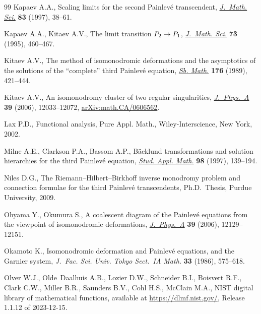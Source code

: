 \documentclass[11pt]{article}
\numberwithin{equation}{section}
\numberwithin{equation}{section}
\begin{document}
\begin{thebibliography}{99}
Kapaev A.A., Scaling limits for the second {P}ainlev\'e transcendent,
 \href{https://doi.org/10.1007/BF02398460}{\textit{J.~Math. Sci.}} \textbf{83} (1997), 38--61.

Kapaev A.A., Kitaev A.V., The limit transition {${\rm P}_2\to{\rm P}_1$},
 \href{https://doi.org/10.1007/BF02364568}{\textit{J.~Math. Sci.}} \textbf{73} (1995), 460--467.

Kitaev A.V., The method of isomonodromic deformations and the asymptotics of
 the solutions of the ``complete'' third {P}ainlev\'e equation, \href{https://doi.org/10.1070/SM1989v062n02ABEH003247}{\textit{Sb.
 Math.}} \textbf{176} (1989), 421--444.

Kitaev A.V., An isomonodromy cluster of two regular singularities,
 \href{https://doi.org/10.1088/0305-4470/39/39/S03}{\textit{J.~Phys.~A}} \textbf{39} (2006), 12033--12072,
 \href{https://arxiv.org/abs/math.CA/0606562}{arXiv:math.CA/0606562}.

Lax P.D., Functional analysis, Pure Appl. Math., Wiley-Interscience, New York,
 2002.

Milne A.E., Clarkson P.A., Bassom A.P., B\"acklund transformations and solution
 hierarchies for the third {P}ainlev\'e equation, \href{https://doi.org/10.1111/1467-9590.00044}{\textit{Stud. Appl. Math.}}
 \textbf{98} (1997), 139--194.

Niles D.G., The {R}iemann--{H}ilbert--{B}irkhoff inverse monodromy problem and
 connection formulae for the third {P}ainlev\'e transcendents, Ph.D.~Thesis,
 {P}urdue {U}niversity, 2009.

Ohyama Y., Okumura S., A coalescent diagram of the {P}ainlev\'e equations from
 the viewpoint of isomonodromic deformations, \href{https://doi.org/10.1088/0305-4470/39/39/S08}{\textit{J.~Phys.~A}} \textbf{39}
 (2006), 12129--12151.

Okamoto K., Isomonodromic deformation and {P}ainlev\'e equations, and the
 {G}arnier system, \textit{J.~Fac. Sci. Univ. Tokyo Sect.~IA Math.}
 \textbf{33} (1986), 575--618.

Olver W.J., Olde~Daalhuis A.B., Lozier D.W., Schneider B.I., Boisvert R.F.,
 Clark C.W., Miller B.R., Saunders B.V., Cohl H.S., McClain M.A., NIST digital
 library of mathematical functions, available at \url{https://dlmf.nist.gov/},
 Release 1.1.12 of 2023-12-15.


\end{thebibliography}
\end{document}
